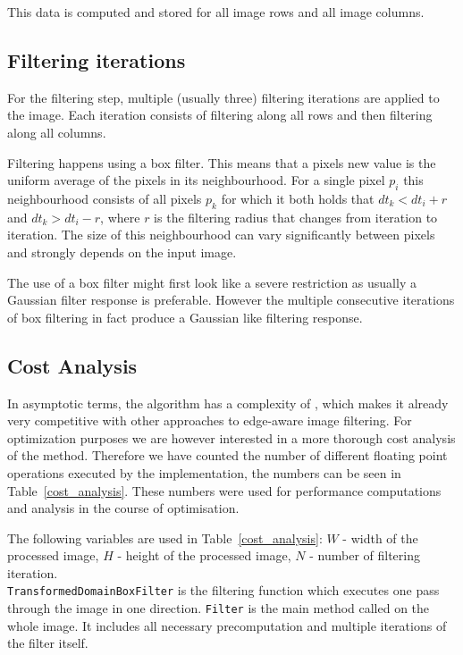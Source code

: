 This data is computed and stored for all image rows and all image columns.

\subsection{Filtering iterations}

For the filtering step, multiple (usually three) filtering iterations are applied to the image. Each iteration consists of filtering along all rows and then filtering along all columns.

Filtering happens using a box filter. This means that a pixels new value is the uniform average of the pixels in its neighbourhood. For a single pixel $p_i$ this neighbourhood consists of all pixels $p_k$ for which it both holds that $dt_k < dt_i+r$ and $dt_k > dt_i-r$, where $r$ is the filtering radius that changes from iteration to iteration. The size of this neighbourhood can vary significantly between pixels and strongly depends on the input image.

The use of a box filter might first look like a severe restriction as usually a Gaussian filter response is preferable. However the multiple consecutive iterations of box filtering in fact produce a Gaussian like filtering response.

\subsection{Cost Analysis}
In asymptotic terms, the algorithm has a complexity of , which makes it already very competitive with other approaches to edge-aware image filtering. For optimization purposes we are however interested in a more thorough cost analysis of the method. Therefore we have counted the number of different floating point operations executed by the implementation, the numbers can be seen in Table~\ref{cost_analysis}. These numbers were used for performance computations and analysis in the course of optimisation.

The following variables are used in Table~\ref{cost_analysis}: $W$ - width of the processed image, $H$ - height of the processed image, $N$ - number of filtering iteration. \\ \lstinline{TransformedDomainBoxFilter} is the filtering function which executes one pass through the image in one direction. \lstinline{Filter} is the main method called on the whole image. It includes all necessary precomputation and multiple iterations of the filter itself.

